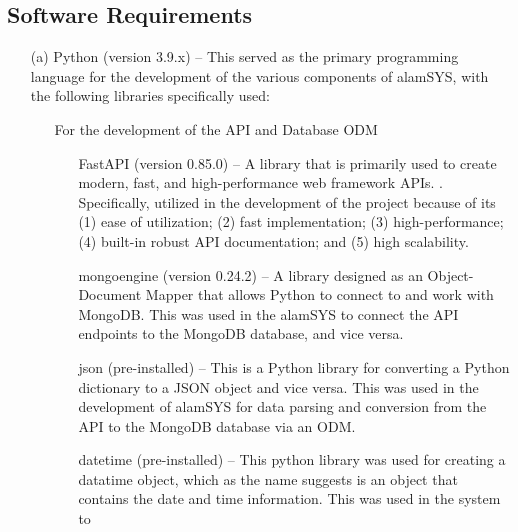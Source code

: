 \subsection{Software Requirements}
\label{sec:software_requirements}
\begin{itemize}
    \item[(a)] Python (version 3.9.x) – This served as the primary 
    programming language for the development of the various 
    components of alamSYS, with the following libraries specifically 
    used:
        \begin{itemize}
            \item[\ding{108}] For the development of the API and Database ODM
                \begin{itemize}
                    \item[\ding{109}] FastAPI (version 0.85.0) – A library that is 
                    primarily used to create modern, fast, and 
                    high-performance web framework APIs. 
                    \cite{Tiangolo}.
                    Specifically, utilized in the development of the project 
                    because of its 
                    (1) ease of utilization; 
                    (2) fast implementation; 
                    (3) high-performance; 
                    (4) built-in robust API documentation; and 
                    (5) high scalability.
                    \item[\ding{109}] mongoengine (version 0.24.2) – A library 
                    designed as an Object-Document Mapper that allows Python to 
                    connect to and work with MongoDB.
                    \cite{MongoEngine}
                    This was used in the alamSYS to connect the API endpoints to the 
                    MongoDB database, and vice versa.
                    \item[\ding{109}] json (pre-installed) – This is a Python library for 
                    converting a Python dictionary to a JSON object and vice versa. 
                    This was used in the development of alamSYS for data 
                    parsing and conversion from the API to the MongoDB database 
                    via an ODM.
                    \item[\ding{109}] datetime (pre-installed) – This python library was
                    used for creating a datatime object, which as the name 
                    suggests is an object that contains the date 
                    and time information. This was used in the system to 

\end{itemize}
\end{itemize}
\end{itemize}
